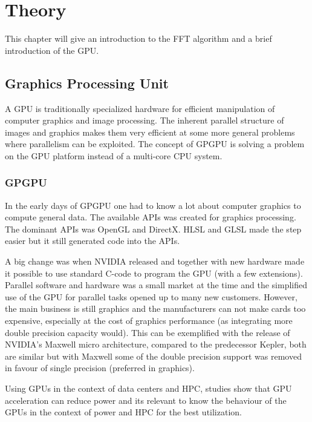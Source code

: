 \chapter{Theory}

This chapter will give an introduction to the \gls{FFT} algorithm and a brief introduction of the \gls{GPU}.

\section{Graphics Processing Unit}

A GPU is traditionally specialized hardware for efficient manipulation of computer graphics and image processing\cite{owens2008gpu}. The inherent parallel structure of images and graphics makes them very efficient at some more general problems where parallelism can be exploited. The concept of \gls{GPGPU} is solving a problem on the \gls{GPU} platform instead of a multi-core \gls{CPU} system.

\subsection{GPGPU}

In the early days of \gls{GPGPU} one had to know a lot about computer graphics to compute general data. The available APIs was created for graphics processing. The dominant \gls{API}s was OpenGL and DirectX. \gls{HLSL} and \gls{GLSL} made the step easier but it still generated code into the \gls{API}s.

A big change was when NVIDIA released {\CU} and together with new hardware made it possible to use standard C-code to program the \gls{GPU} (with a few extensions). Parallel software and hardware was a small market at the time and the simplified use of the \gls{GPU} for parallel tasks opened up to many new customers. However, the main business is still graphics and the manufacturers can not make cards too expensive, especially at the cost of graphics performance (as integrating more double precision capacity would). This can be exemplified with the release of NVIDIA's Maxwell micro architecture, compared to the predecessor Kepler, both are similar but with Maxwell some of the double precision support was removed in favour of single precision (preferred in graphics).

Using GPUs in the context of data centers and \gls{HPC}, studies show that \gls{GPU} acceleration can reduce power\cite{huang2009energy} and its relevant to know the behaviour of the GPUs in the context of power and \gls{HPC}\cite{ghosh2012energy} for the best utilization.

